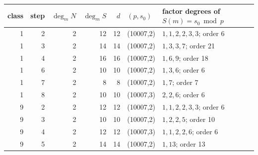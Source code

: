 \begin{tabular}{@{}rrrrrll@{}}\toprule class & step & $\deg_m N$ & $\deg_m S$ & $d$ & $(p,s_0)$ & factor degrees of $S(m)=s_0 \bmod p$ \\\midrule
1 & 2 & 2 & 12 & 12 & (10007,2) & {\footnotesize $1,1,2,2,3,3$}; order 6 \\
1 & 3 & 2 & 14 & 14 & (10007,2) & {\footnotesize $1,3,3,7$}; order 21 \\
1 & 4 & 2 & 16 & 16 & (10007,2) & {\footnotesize $1,6,9$}; order 18 \\
1 & 6 & 2 & 10 & 10 & (10007,2) & {\footnotesize $1,3,6$}; order 6 \\
1 & 7 & 2 & 8 & 8 & (10007,2) & {\footnotesize $1,7$}; order 7 \\
1 & 8 & 2 & 10 & 10 & (10007,3) & {\footnotesize $2,2,6$}; order 6 \\
9 & 2 & 2 & 12 & 12 & (10007,2) & {\footnotesize $1,1,2,2,3,3$}; order 6 \\
9 & 3 & 2 & 10 & 10 & (10007,2) & {\footnotesize $1,2,2,5$}; order 10 \\
9 & 4 & 2 & 12 & 12 & (10007,3) & {\footnotesize $1,1,2,2,6$}; order 6 \\
9 & 5 & 2 & 14 & 14 & (10007,2) & {\footnotesize $1,13$}; order 13 \\
\bottomrule\end{tabular}
